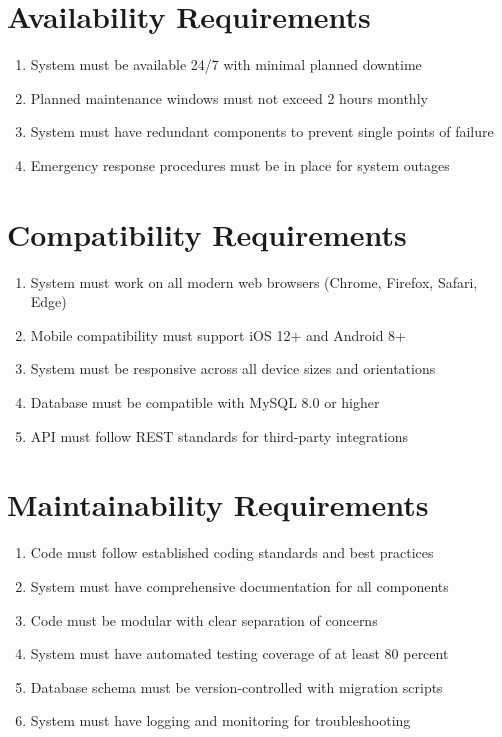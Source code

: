 \documentclass[12pt,a4paper]{report}
\begin{document}
\section{Availability Requirements}
\begin{enumerate}
    \item System must be available 24/7 with minimal planned downtime
    \item Planned maintenance windows must not exceed 2 hours monthly
    \item System must have redundant components to prevent single points of failure
    \item Emergency response procedures must be in place for system outages
\end{enumerate}

\section{Compatibility Requirements}
\begin{enumerate}
    \item System must work on all modern web browsers (Chrome, Firefox, Safari, Edge)
    \item Mobile compatibility must support iOS 12+ and Android 8+
    \item System must be responsive across all device sizes and orientations
    \item Database must be compatible with MySQL 8.0 or higher
    \item API must follow REST standards for third-party integrations
\end{enumerate}

\section{Maintainability Requirements}
\begin{enumerate}
    \item Code must follow established coding standards and best practices
    \item System must have comprehensive documentation for all components
    \item Code must be modular with clear separation of concerns
    \item System must have automated testing coverage of at least 80 percent
    \item Database schema must be version-controlled with migration scripts
    \item System must have logging and monitoring for troubleshooting
\end{enumerate}
\end{document}
